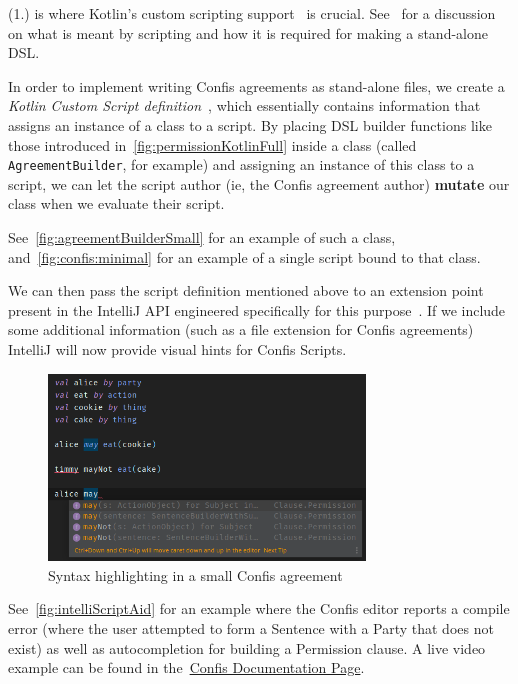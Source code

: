 (1.) is where Kotlin's custom scripting support~\cite{kotlinScriptKeep} is crucial.
See~ for a discussion on what is meant by scripting and how it is required for making a stand-alone DSL.

In order to implement writing Confis agreements as stand-alone files, we create a \emph{Kotlin Custom Script definition}~\cite{kotlinScriptKeep}, which essentially contains information that assigns an instance of a class to a script.
By placing DSL builder functions like those introduced in~\autoref{fig:permissionKotlinFull} inside a class (called \texttt{AgreementBuilder}, for example) and assigning an instance of this class to a script, we can let the script author (ie, the Confis agreement author) \textbf{mutate} our class when we evaluate their script.

See~\autoref{fig:agreementBuilderSmall} for an example of such a class, and~\autoref{fig:confis:minimal} for an example of a single script bound to that class.

We can then pass the script definition mentioned above to an extension point present in the IntelliJ API engineered specifically for this purpose~\cite{ideaExtensionPoints, intelliJRepo}.
If we include some additional information (such as a file extension for Confis agreements) IntelliJ will now provide visual hints for Confis Scripts.

\begin{figure}[h]
    \centering
    \includegraphics[width=0.75\textwidth]{figures/minimal.editor.highlighting.confis}
    \caption{Syntax highlighting in a small Confis agreement}
    \label{fig:intelliScriptAid}
\end{figure}

See~\autoref{fig:intelliScriptAid} for an example where the Confis editor reports a compile error (where the user attempted to form a Sentence with a Party that does not exist) as well as autocompletion for building a Permission clause.
A live video example can be found in the~\href{https://confis.dcotta.eu/0.1.1/IDE%20Support/IDEAPlugin/}{Confis Documentation Page}.

